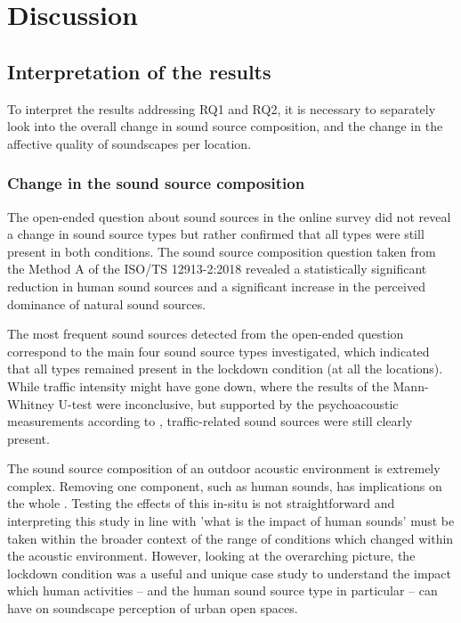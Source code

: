 
\section{Discussion}

 \subsection{Interpretation of the results}

   To interpret the results addressing RQ1 and RQ2, it is necessary to separately look into the overall change in sound source composition, and the change in the affective quality of soundscapes per location.

   \subsubsection{Change in the sound source composition}

   The open-ended question about sound sources in the online survey did not reveal a change in sound source types but rather confirmed that all types were still present in both conditions. The sound source composition question taken from the Method A of the ISO/TS 12913-2:2018 \citep{ISO12913Part2} revealed a statistically significant reduction in human sound sources and a significant increase in the perceived dominance of natural sound sources.

   The most frequent sound sources detected from the open-ended question correspond to the main four sound source types investigated, which indicated that all types remained present in the lockdown condition (at all the locations). While traffic intensity might have gone down, where the results of the Mann-Whitney U-test were inconclusive, but supported by the psychoacoustic measurements according to \citet{Aletta2020Assessing}, traffic-related sound sources were still clearly present.

   The sound source composition of an outdoor acoustic environment is extremely complex. Removing one component, such as human sounds, has implications on the whole \citep{Gordo2021Rapid}. Testing the effects of this in-situ is not straightforward and interpreting this study in line with 'what is the impact of human sounds' must be taken within the broader context of the range of conditions which changed within the acoustic environment. However, looking at the overarching picture, the lockdown condition was a useful and unique case study to understand the impact which human activities -- and the human sound source type in particular -- can have on soundscape perception of urban open spaces.

